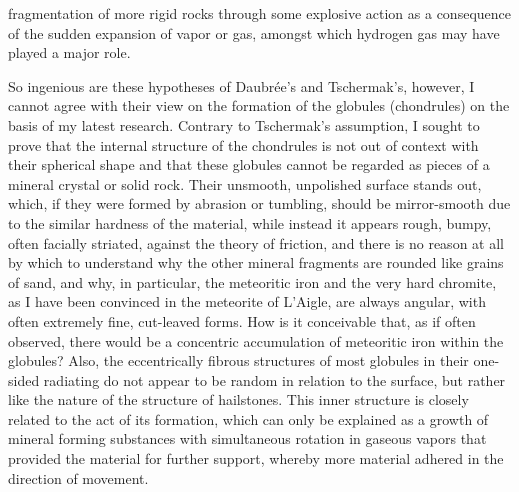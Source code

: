 \documentclass[a4paper, 12pt, oneside]{article}
\begin{document}
fragmentation of more rigid rocks through some explosive action as a consequence of the sudden expansion of vapor or gas, amongst which hydrogen gas may have played a major role.

So ingenious are these hypotheses of Daubrée's and Tschermak's, however, I cannot agree with their view on the formation of the globules (chondrules) on the basis of my latest research. Contrary to Tschermak's assumption, I sought to prove that the internal structure of the chondrules is not out of context with their spherical shape and that these globules cannot be regarded as pieces of a mineral crystal or solid rock. Their unsmooth, unpolished surface stands out, which, if they were formed by abrasion or tumbling, should be mirror-smooth due to the similar hardness of the material, while instead it appears rough, bumpy, often facially striated, against the theory of friction, and there is no reason at all by which to understand why the other mineral fragments are rounded like grains of sand, and why, in particular, the meteoritic iron and the very hard chromite, as I have been convinced in the meteorite of L'Aigle, are always angular, with often extremely fine, cut-leaved forms. How is it conceivable that, as if often observed, there would be a concentric accumulation of meteoritic iron within the globules? Also, the eccentrically fibrous structures of most globules in their one-sided radiating do not appear to be random in relation to the surface, but rather like the nature of the structure of hailstones. This inner structure is closely related to the act of its formation, which can only be explained as a growth of mineral forming substances with simultaneous rotation in gaseous vapors that provided the material for further support, whereby more material adhered in the direction of movement.
\end{document}
